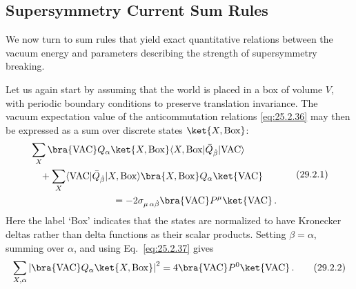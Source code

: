 
\subsection{Supersymmetry Current Sum Rules}

We now turn to sum rules that yield exact quantitative relations between
the vacuum energy and parameters describing the strength of supersymmetry
breaking.

Let us again start by assuming that the world is placed in a box of volume
\(V\), with periodic boundary conditions to preserve translation
invariance. The vacuum expectation value of the anticommutation relations
\eqref{eq:25.2.36} may then be expressed as a sum over discrete states
\(\ket{X,\mathrm{Box}}\):
\begin{equation}
  \begin{aligned}
  &\sum_X
    \bra{\mathrm{VAC}} Q_\alpha\ket{X,\mathrm{Box}}
    \langle X,\mathrm{Box}\lvert
      \bar Q_{\dot\beta}\rvert\mathrm{VAC}\rangle
  \\
  &\quad
  +\sum_X
    \langle\mathrm{VAC}\lvert\bar Q_{\dot\beta}
      \rvert X,\mathrm{Box}\rangle
    \bra{X,\mathrm{Box}} Q_\alpha\ket{\mathrm{VAC}}
  \\
  &\hspace{30mm}
  =-2\sigma_{\mu\,\alpha\dot\beta}
    \bra{\mathrm{VAC}} P^\mu\ket{\mathrm{VAC}}\,.
  \end{aligned}
  \tag{29.2.1}\label{eq:29.2.1}
\end{equation}
Here the label `Box' indicates that the states are normalized to have
Kronecker deltas rather than delta functions as their scalar products.
Setting \(\beta=\alpha\), summing over \(\alpha\), and using
Eq.~\eqref{eq:25.2.37} gives
\begin{equation}
  \sum_{X,\alpha}
  \left\lvert
    \bra{\mathrm{VAC}} Q_\alpha\ket{X,\mathrm{Box}}
  \right\rvert^2
  =4\bra{\mathrm{VAC}} P^0\ket{\mathrm{VAC}}\,.
  \tag{29.2.2}\label{eq:29.2.2}
\end{equation}

